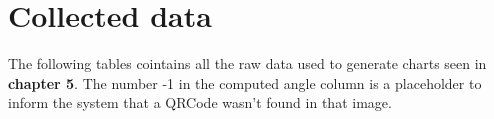 \chapter{Collected data}
The following tables cointains all the raw data used to generate charts seen in \textbf{chapter 5}.
The number -1 in the computed angle column is a placeholder to inform the system that a QRCode wasn't found in that image. 
 

